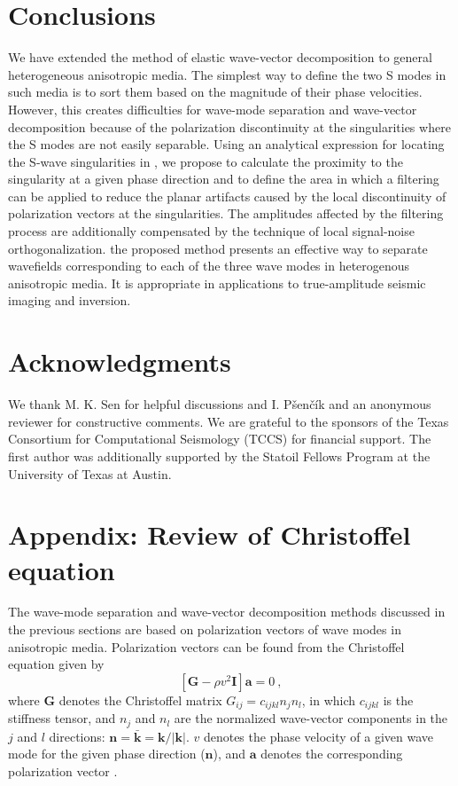 \section{Conclusions}
We have extended the method of elastic wave-vector decomposition to general heterogeneous anisotropic media.
The simplest way to define the two S modes in such media is to sort them based on the magnitude of their phase velocities. However, this creates difficulties for wave-mode separation and wave-vector decomposition because of the polarization discontinuity at the singularities where the S modes are not easily separable. Using an analytical expression for locating the S-wave singularities in , we propose to calculate the proximity to the singularity at a given phase direction and to define the area in which a filtering can be applied to reduce the planar artifacts caused by the local discontinuity of polarization vectors at the singularities. The amplitudes affected by the filtering process are additionally compensated by the technique of local signal-noise orthogonalization.  the proposed method presents an effective way to separate wavefields corresponding to each of the three wave modes in heterogenous anisotropic media. It is appropriate in applications to true-amplitude seismic imaging and inversion.

\section{Acknowledgments}
We thank M. K. Sen for helpful discussions and I. P\v{s}en\v{c}\'{i}k and an anonymous reviewer for constructive comments.
We are grateful to the sponsors of the Texas Consortium for Computational Seismology (TCCS) for financial support. The first author was additionally supported by the Statoil Fellows Program at the University of Texas at Austin.


\appendix
\section{Appendix: Review of Christoffel equation}
The wave-mode separation and wave-vector decomposition methods discussed in the previous sections are based on polarization vectors of wave modes in anisotropic media. Polarization vectors can be found from the Christoffel equation given by
\begin{equation}
	\left[\mathbf{G}-\rho v^2 \mathbf{I}  \right]\mathbf{a} = 0~,
\end{equation}
where $\mathbf{G}$ denotes the Christoffel matrix $G_{ij} = c_{ijkl}n_{j}n_{l}$, in which $c_{ijkl}$ is the stiffness tensor, and $n_j$ and $n_l$
are the normalized wave-vector components in the $j$ and $l$ directions: $\mathbf{n} = \mathbf{\bar{k}} = \mathbf{k}/|\mathbf{k}|$. $v$ denotes the phase velocity of a given wave mode for the given phase direction ($\mathbf{n}$), and $\mathbf{a}$ denotes the corresponding polarization vector \cite[]{cerveny}.

